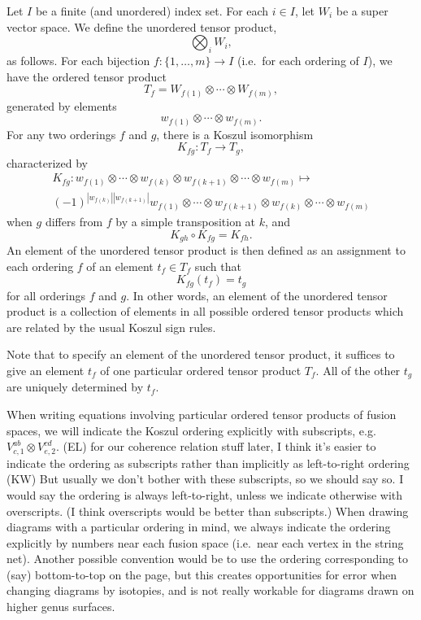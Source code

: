 \documentclass[12pt,a4paper]{article}
\newcommand{\tp}{\otimes}
\newcommand\be            {\begin{equation}}
\newcommand\ee            {\end{equation}}
\newcommand{\kw}[1]{{\color{kwcolor}\footnotesize{(KW) #1}}}
\newcommand{\ethan}[1]{{\color{amethyst}\footnotesize{(EL) #1}}}
\begin{document}
Let $I$ be a finite (and unordered) index set.
For each $i\in I$, let $W_i$ be a super vector space.
We define the unordered tensor product,
\be
	\bigotimes_i W_i ,
\ee
as follows.
For each bijection $f: \{1, \ldots,m\} \to I$ (i.e.\ for each ordering of $I$),
we have the ordered tensor product
\be
	T_f = W_{f(1)}\otimes\cdots\otimes W_{f(m)} ,
\ee
generated by elements
\be
	w_{f(1)}\otimes\cdots\otimes w_{f(m)}.
\ee
For any two orderings $f$ and $g$, there is a Koszul isomorphism
\be
	K_{fg} : T_f \to T_g ,
\ee
characterized by
\begin{multline}
	K_{fg} : w_{f(1)}\otimes\cdots\otimes w_{f(k)} \otimes w_{f(k+1)} \otimes \cdots \otimes w_{f(m)} \mapsto \\
				(-1)^{|w_{f(k)}||w_{f(k+1)}|} w_{f(1)}\otimes\cdots\otimes w_{f(k+1)} \otimes w_{f(k)} \otimes \cdots \otimes w_{f(m)}
\end{multline}
when $g$ differs from $f$ by a simple transposition at $k$, and
\be
	K_{gh} \circ K_{fg} = K_{fh} .
\ee
An element of the unordered tensor product is then defined as an assignment to each ordering $f$ of an element $t_f\in T_f$
such that
\be
	K_{fg}(t_f) = t_g
\ee
for all orderings $f$ and $g$.
In other words, an element of the unordered tensor product is a collection of elements in all 
possible ordered tensor products which are related by the usual Koszul sign rules.

Note that to specify an element of the unordered tensor product, it suffices to give an element $t_f$ of one
particular ordered tensor product $T_f$.
All of the other $t_g$ are uniquely determined by $t_f$.

When writing equations involving particular ordered tensor products of fusion spaces, we will indicate the Koszul ordering 
explicitly with subscripts, e.g. $V^{ab}_{c,1} \tp V^{cd}_{e,2}$. \ethan{for our coherence relation stuff later, I think it's easier to indicate the ordering as subscripts rather than implicitly as left-to-right ordering}
\kw{But usually we don't bother with these subscripts, so we should say so.
I would say the ordering is always left-to-right, unless we indicate otherwise with overscripts.
(I think overscripts would be better than subscripts.)}
When drawing diagrams with a particular ordering in mind, we always indicate the ordering explicitly by numbers near each fusion space (i.e.\ near
each vertex in the string net).
Another possible convention would be to use the ordering corresponding to (say) bottom-to-top on the page,
but this creates opportunities for error when changing diagrams by isotopies,
and is not really workable for diagrams drawn on higher genus surfaces.
\end{document}
